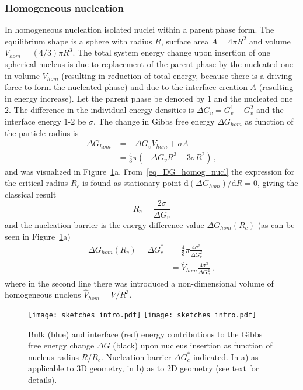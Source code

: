         \subsubsection{Homogeneous nucleation}
        In homogeneous nucleation isolated nuclei within a parent phase form. The equilibrium shape is a sphere with radius $R$, surface area $A=4\pi R^2$ and volume $V_{hom}=(4/3)\pi R^3$. The total system energy change upon insertion of one spherical nucleus is due to replacement of the parent phase by the nucleated one in volume $V_{hom}$ (resulting in reduction of total energy, because there is a driving force to form the nucleated phase) and due to the interface creation $A$ (resulting in energy increase). Let the parent phase be denoted by $\mathit{1}$ and the nucleated one $\mathit{2}$. The difference in the individual energy densities is $\Delta G_v=G_v^\mathit{1}-G_v^\mathit{2}$ and the interface energy $\mathit{1}$-$\mathit{2}$ be $\sigma$.  The change in Gibbs free energy $\Delta G_{hom}$ as function of the particle radius is
        \begin{align}
            \Delta G_{hom} &= -\Delta G_v V_{hom} + \sigma A  \\
                &= \frac{4}{3}\pi(-\Delta G_v R^3 + 3\sigma R^2)\,, \label{eq_DG_homog_nucl}
        \end{align}
        and was visualized in Figure~\ref{fig_nucl_barrier}a. From~\eqref{eq_DG_homog_nucl} the expression for the critical radius $R_c$ is found as stationary point $\mathrm{d}(\Delta G_{hom})/\mathrm{d}R=0$, giving the classical result
        \begin{equation} \label{eq_crit_radius}
            R_c = \frac{2\sigma}{\Delta G_v}
        \end{equation}
        and the nucleation barrier is the energy difference value $\Delta G_{hom}(R_c)$ (as can be seen in Figure~\ref{fig_nucl_barrier}a)
        \begin{align}
            \Delta G_{hom}(R_c) = \Delta G_c^* &= \frac{4}{3}\pi\frac{4\sigma^3}{\Delta G_v^2}    \\
                &= \hat{V}_{hom}\frac{4\sigma^3}{\Delta G_v^2} \,,\label{eq_crit_nucl_barrier_hom_iso}
        \end{align}
        where in the second line there was introduced a non-dimensional volume of homogeneous nucleus $\hat{V}_{hom}=V/R^3$.
        
        \begin{figure}
            \centering
            \texttt{[image: sketches\_intro.pdf]}
            \texttt{[image: sketches\_intro.pdf]}
            \caption{Bulk (blue) and interface (red) energy contributions to the Gibbs free energy change $\Delta G$ (black) upon nucleus insertion as function of nucleus radius $R/R_c$. Nucleation barrier $\Delta G_c^*$ indicated. In a) as applicable to 3D geometry, in b) as to 2D geometry (see text for details).}
            \label{fig_nucl_barrier}
        \end{figure}
        
